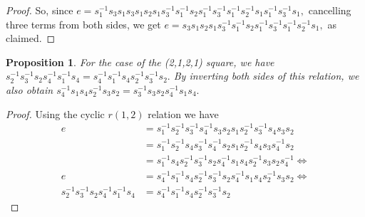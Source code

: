 \documentclass[11pt]{amsart}
\newtheorem{prop}[thm]{Proposition}
\theoremstyle{definition}
\newcommand\fri{s_4^{-1}}
\newcommand\fr{s_4}
\newcommand\tri{s_3^{-1}}
\newcommand\tr{s_3}
\newcommand\twi{s_2^{-1}}
\newcommand\tw{s_2}
\newcommand\oni{s_1^{-1}}
\newcommand\on{s_1}
\begin{document}
\begin{proof}
So, since $e = \oni\tr\on\tr\on\tw\on\tri\oni\tw\oni\tri\oni\twi\on\oni\tri\on,$ cancelling three terms from both sides, we get $e =\tr\on\tw\on\tri\oni\tw\oni\tri\oni\twi\on,$ as claimed.
\end{proof}

\begin{prop}
\label{commuting_triples}
For the case of the (2,1,2,1) square, we have $\twi\tri\tw\fri\oni\fr = \fri\oni\fr\twi\tri\tw.$
By inverting both sides of this relation, we also obtain
$\fri\on\fr\twi\tr\tw = \tri\tr\tw\fri\on\fr.$
\end{prop}
\begin{proof}
Using the cyclic $r(1,2)$ relation we have
\begin{align*}
	e &= \oni\twi\tri\fri\tr\tw\on\twi\tri\fr\tr\tw\\
	&= \oni\twi\fr\tri\fri\tw\on\twi\fr\tr\fri\tw \\
	&= \oni\fr\twi\tri\tw\fri\on\fr\twi\tr\tw\fri \iff \\
	e &= \fri\oni\fr\twi\tri\tw\fri\on\fr\twi\tr\tw \iff \\
	\twi\tri\tw\fri\oni\fr &= \fri\oni\fr\twi\tri\tw
\end{align*}
\end{proof}
\end{document}

